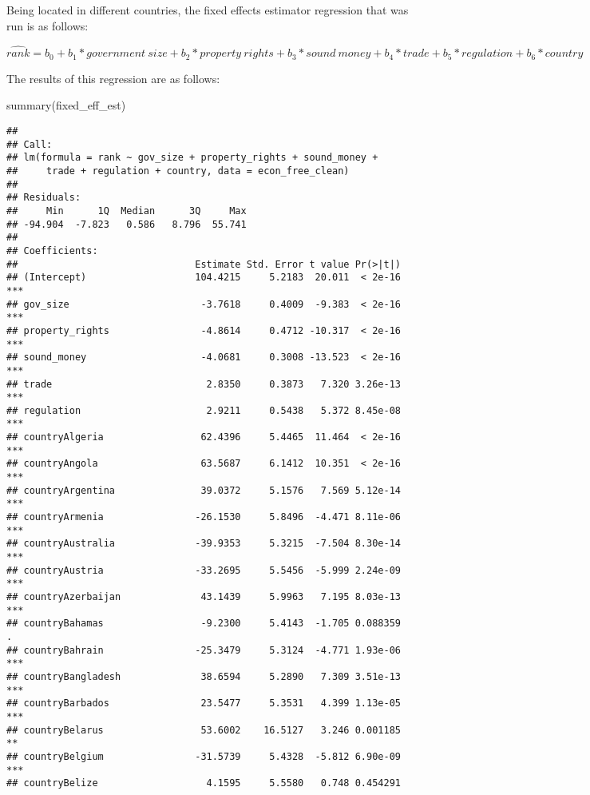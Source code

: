 \documentclass[
  11pt,
]{article}
\newenvironment{Shaded}{\begin{snugshade}}{\end{snugshade}}
\newcommand{\FunctionTok}[1]{\textcolor[rgb]{0.00,0.00,0.00}{#1}}
\newcommand{\NormalTok}[1]{#1}
\begin{document}
Being located in different countries, the fixed effects estimator
regression that was run is as follows:

\[ \hat{rank} = b_0 + b_1 * government \ size + b_2 * property \ rights + b_3 * sound \ money + b_4 * trade + b_5 * regulation + b_6 * country \]

The results of this regression are as follows:

\begin{Shaded}
\begin{Highlighting}[]
\FunctionTok{summary}\NormalTok{(fixed\_eff\_est)}
\end{Highlighting}
\end{Shaded}

\begin{verbatim}
## 
## Call:
## lm(formula = rank ~ gov_size + property_rights + sound_money + 
##     trade + regulation + country, data = econ_free_clean)
## 
## Residuals:
##     Min      1Q  Median      3Q     Max 
## -94.904  -7.823   0.586   8.796  55.741 
## 
## Coefficients:
##                               Estimate Std. Error t value Pr(>|t|)    
## (Intercept)                   104.4215     5.2183  20.011  < 2e-16 ***
## gov_size                       -3.7618     0.4009  -9.383  < 2e-16 ***
## property_rights                -4.8614     0.4712 -10.317  < 2e-16 ***
## sound_money                    -4.0681     0.3008 -13.523  < 2e-16 ***
## trade                           2.8350     0.3873   7.320 3.26e-13 ***
## regulation                      2.9211     0.5438   5.372 8.45e-08 ***
## countryAlgeria                 62.4396     5.4465  11.464  < 2e-16 ***
## countryAngola                  63.5687     6.1412  10.351  < 2e-16 ***
## countryArgentina               39.0372     5.1576   7.569 5.12e-14 ***
## countryArmenia                -26.1530     5.8496  -4.471 8.11e-06 ***
## countryAustralia              -39.9353     5.3215  -7.504 8.30e-14 ***
## countryAustria                -33.2695     5.5456  -5.999 2.24e-09 ***
## countryAzerbaijan              43.1439     5.9963   7.195 8.03e-13 ***
## countryBahamas                 -9.2300     5.4143  -1.705 0.088359 .  
## countryBahrain                -25.3479     5.3124  -4.771 1.93e-06 ***
## countryBangladesh              38.6594     5.2890   7.309 3.51e-13 ***
## countryBarbados                23.5477     5.3531   4.399 1.13e-05 ***
## countryBelarus                 53.6002    16.5127   3.246 0.001185 ** 
## countryBelgium                -31.5739     5.4328  -5.812 6.90e-09 ***
## countryBelize                   4.1595     5.5580   0.748 0.454291    

\end{verbatim}
\end{document}
